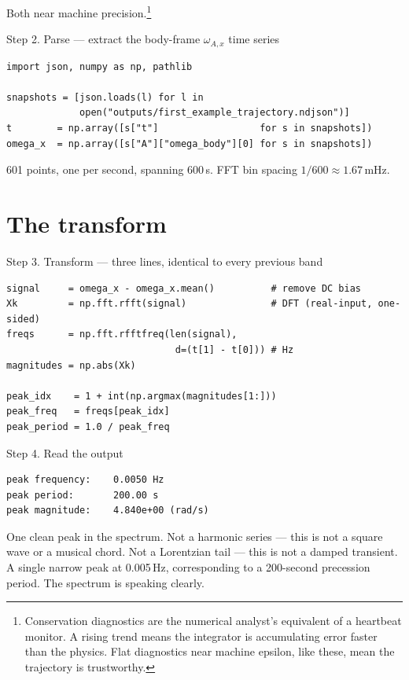 \documentclass[11pt,a4paper,openany]{book}
\begin{document}
Both near machine precision.\footnote{Conservation diagnostics are the
numerical analyst's equivalent of a heartbeat monitor. A rising trend means
the integrator is accumulating error faster than the physics. Flat diagnostics
near machine epsilon, like these, mean the trajectory is trustworthy.}

\begin{pipelinestep}{Step 2. Parse --- extract the body-frame $\omega_{A,x}$ time series}
\begin{lstlisting}[style=shadpython]
import json, numpy as np, pathlib

snapshots = [json.loads(l) for l in
             open("outputs/first_example_trajectory.ndjson")]
t        = np.array([s["t"]                  for s in snapshots])
omega_x  = np.array([s["A"]["omega_body"][0] for s in snapshots])
\end{lstlisting}
\end{pipelinestep}

601 points, one per second, spanning 600\,s. FFT bin spacing
$1/600 \approx 1.67$\,mHz.

\section{The transform}

\begin{pipelinestep}{Step 3. Transform --- three lines, identical to every previous band}
\begin{lstlisting}[style=shadpython]
signal     = omega_x - omega_x.mean()          # remove DC bias
Xk         = np.fft.rfft(signal)               # DFT (real-input, one-sided)
freqs      = np.fft.rfftfreq(len(signal),
                              d=(t[1] - t[0])) # Hz
magnitudes = np.abs(Xk)

peak_idx    = 1 + int(np.argmax(magnitudes[1:]))
peak_freq   = freqs[peak_idx]
peak_period = 1.0 / peak_freq
\end{lstlisting}
\end{pipelinestep}

\begin{pipelinestep}{Step 4. Read the output}
\begin{lstlisting}[style=shaddata]
peak frequency:    0.0050 Hz
peak period:       200.00 s
peak magnitude:    4.840e+00 (rad/s)
\end{lstlisting}
\end{pipelinestep}

One clean peak in the spectrum. Not a harmonic series --- this is not a square
wave or a musical chord. Not a Lorentzian tail --- this is not a damped
transient. A single narrow peak at 0.005\,Hz, corresponding to a 200-second
precession period. The spectrum is speaking clearly.
\end{document}
